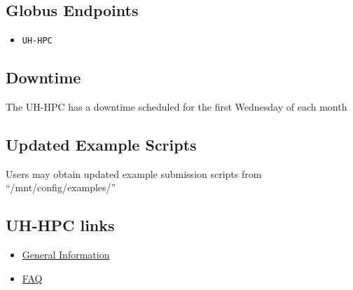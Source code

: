 \documentclass[11pt,twocolumn]{article}
\begin{document}
\subsection{Globus Endpoints}
\begin{itemize}
\item[] \texttt{UH-HPC}
\end{itemize}


\subsection{Downtime}
The UH-HPC has a downtime scheduled for the first Wednesday of each month


\subsection{Updated Example Scripts}
Users may obtain updated example submission scripts from ``/mnt/config/examples/''



\subsection{UH-HPC links}
\begin{itemize}
\item[]  \href{https://www.hawaii.edu/its/ci/xcat/}{General Information}
\item[] \href{http://go.hawaii.edu/jdG}{FAQ}
\end{itemize}
\end{document}
